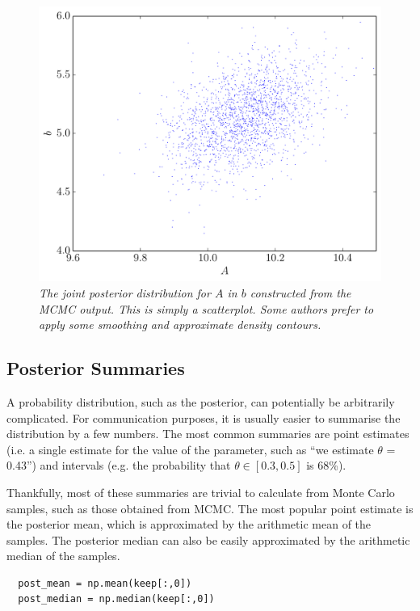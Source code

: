 \begin{figure}
\begin{center}
\includegraphics[scale=0.45]{joint_posterior.pdf}
\caption{\it The joint posterior distribution for $A$ in $b$ constructed from
the MCMC output. This is simply a scatterplot. Some authors prefer to
apply some smoothing and approximate density contours.
\label{fig:joint_posterior}}
\end{center}
\end{figure}


\subsection{Posterior Summaries}
A probability distribution, such as the posterior,
can potentially be arbitrarily complicated. For communication purposes, it is
usually easier to summarise the distribution by a few numbers. The most common
summaries are point estimates (i.e. a single estimate for the value of the
parameter, such as ``we estimate $\theta$ = 0.43'') and intervals (e.g.
the probability that $\theta \in [0.3, 0.5]$ is 68\%).

Thankfully, most of these summaries are trivial to calculate from Monte Carlo
samples, such as those obtained from MCMC. The most popular point estimate is
the posterior mean, which is approximated by the arithmetic mean of the samples.
The posterior median can also be easily approximated by the arithmetic median
of the samples.

\begin{verbatim}
  post_mean = np.mean(keep[:,0])
  post_median = np.median(keep[:,0])
\end{verbatim}

